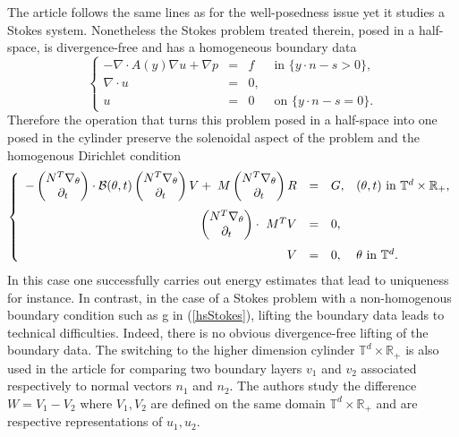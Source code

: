 \documentclass[11pt, reqno]{amsart}
\theoremstyle{definition}
\theoremstyle{remark}
\numberwithin{equation}{section}
\newcommand{\D}{ \left(\!\!\! 
	\begin{array}{c}
		N^T \nabla_{\theta} \\
		\partial_t
	\end{array}
	\!\!\!\right)}
\begin{document}
	 The article \cite{Slip_cond} follows the same lines as for the well-posedness issue yet it studies a Stokes system. Nonetheless the Stokes problem treated therein,  posed in a half-space, is divergence-free and has a homogeneous boundary data
	 	\begin{equation*}
	 	\left\{
	 	\begin{array}{rcll}
	 		-\nabla\cdot A (y ) \nabla u +  \nabla p&=& f & \mbox{ in } \{ y\cdot n-s>0 \},\\
	 		\nabla\cdot u&=&0 ,&\\
	 		u&=&0   &\mbox{ on }  \{y\cdot n-s=0\}.
	 	\end{array}
	 	\right. 
	 \end{equation*}
	  Therefore the operation that turns this problem posed in a half-space into one posed in the cylinder preserve the solenoidal aspect of the problem and the homogenous Dirichlet condition
	\begin{equation}\label{big_Stokes}
		\left\{
		\begin{array}{rcll}
			\vspace{.1in}
			-\D\cdot \bigB(\theta, t) \D V +\;  M\D R&=& G , &(\theta,t) \mbox{ in }\mathbb{T}^d\times \mathbb{R}_+,\\
			\vspace{.1in}
			\D\cdot\ M^T V&=& 0 ,\\
			V&=& 0,   &\theta\mbox{ in }\mathbb{T}^d.
		\end{array}
		\right. 
	\end{equation} 
	In this case one successfully carries out energy estimates that lead to uniqueness for instance. In contrast, in the case of a Stokes problem with a non-homogenous boundary condition such as g in (\ref{hsStokes}), lifting the boundary data leads to technical difficulties. Indeed, there is no obvious divergence-free lifting of the boundary data. 
	The switching  to the higher dimension cylinder  $\mathbb{T}^d\times \mathbb{R}_+$ is also used in the article \cite{AKMP} for comparing two boundary layers $v_1$ and $v_2$ associated respectively to normal vectors $n_1$ and $n_2$. The authors study the difference $W=V_1-V_2$ where  $V_1, V_2$ are  defined on the same domain $\mathbb{T}^d\times \mathbb{R}_+$ and are respective representations of $u_1, u_2.$ 
	
\end{document}
